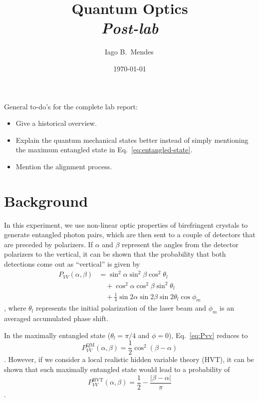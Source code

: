 \documentclass{../paper}
\newcommand{\eq}[1]{Eq.~\eqref{#1}}
\begin{document}
\title{Quantum Optics \\ {\em Post-lab}}

\author{Iago B.~Mendes\,}

\date{\today}

\maketitle

General to-do's for the complete lab report:
\begin{itemize}
  \item Give a historical overview.
  \item Explain the quantum mechanical states better instead of simply mentioning the maximum entangled state in \eq{eq:entangled-state}.
  \item Mention the alignment process.
\end{itemize}

\section{Background}

In this experiment, we use non-linear optic properties of birefringent crystals to generate entangled photon pairs, which are then sent to a couple of detectors that are preceded by polarizers. If $\alpha$ and $\beta$ represent the angles from the detector polarizers to the vertical, it can be shown that the probability that both detections come out as ``vertical'' is given by
\begin{equation}\label{eq:Pvv}
  \begin{aligned}
    P_{VV}(\alpha, \beta)
    &= \sin^2\alpha \sin^2\beta \cos^2\theta_l \\
    &\quad + \cos^2\alpha \cos^2\beta \sin^2\theta_l \\
    &\quad + \frac{1}{4} \sin2\alpha \sin2\beta \sin2\theta_l \cos\phi_m
  \end{aligned}
\end{equation}
\cite{Dehlinger2002}, where $\theta_l$ represents the initial polarization of the laser beam and $\phi_m$ is an averaged accumulated phase shift.

In the maximally entangled state ($\theta_l = \pi/4$ and $\phi = 0$), \eq{eq:Pvv} reduces to
\begin{equation}\label{eq:Pvv-QM}
  P^\text{QM}_{VV}(\alpha, \beta) = \frac{1}{2} \cos^2(\beta - \alpha)
\end{equation}
\cite{Dehlinger2002}. However, if we consider a local realistic hidden variable theory (HVT), it can be shown that such maximally entangled state would lead to a probability of
\begin{equation}\label{eq:Pvv-HVT}
  P^\text{HVT}_{VV}(\alpha, \beta) = \frac{1}{2} - \frac{|\beta - \alpha|}{\pi}
\end{equation}
\cite{Dehlinger2002}.
\end{document}
